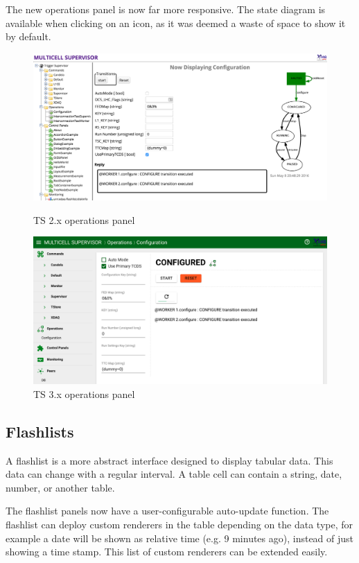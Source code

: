 The new operations panel is now far more responsive.
The state diagram is available when clicking on an icon, as it was deemed a
waste of space to show it by default.
\begin{figure}[H]
  \centering
  \includegraphics[width=\textwidth]{images/ts2_operations}
  \caption{TS 2.x operations panel}
  \label{fig:ts2_operations}
  \centering
  \includegraphics[width=\textwidth]{images/ts3_operations}
  \caption{TS 3.x operations panel}
  \label{fig:ts3_operations}
\end{figure}

\subsection{Flashlists}
A flashlist is a more abstract interface designed to display tabular data.
This data can change with a regular interval. A table cell can contain a string,
date, number, or another table.

The flashlist panels now have a user-configurable auto-update function.
The flashlist can deploy custom renderers in the table depending on the data type,
for example a date will be shown as relative time (e.g. 9 minutes ago), instead
of just showing a time stamp. This list of custom renderers can be extended
easily.

